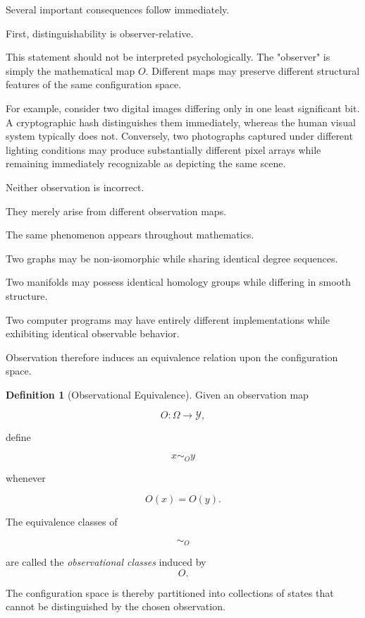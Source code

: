 \documentclass[11pt]{book}
\numberwithin{equation}{chapter}
\theoremstyle{definition}
\newtheorem{definition}{Definition}[chapter]
\theoremstyle{plain}
\begin{document}
Several important consequences follow immediately.

First, distinguishability is observer-relative.

This statement should not be interpreted psychologically. The "observer" is simply the mathematical map \(O\). Different maps may preserve different structural features of the same configuration space.

For example, consider two digital images differing only in one least significant bit. A cryptographic hash distinguishes them immediately, whereas the human visual system typically does not. Conversely, two photographs captured under different lighting conditions may produce substantially different pixel arrays while remaining immediately recognizable as depicting the same scene.

Neither observation is incorrect.

They merely arise from different observation maps.

The same phenomenon appears throughout mathematics.

Two graphs may be non-isomorphic while sharing identical degree sequences.

Two manifolds may possess identical homology groups while differing in smooth structure.

Two computer programs may have entirely different implementations while exhibiting identical observable behavior.

Observation therefore induces an equivalence relation upon the configuration space.

\begin{definition}[Observational Equivalence]

Given an observation map

\[
O:\Omega\rightarrow\mathcal{Y},
\]

define

\[
x\sim_O y
\]

whenever

\[
O(x)=O(y).
\]

The equivalence classes of

\[
\sim_O
\]

are called the \emph{observational classes} induced by
\[
O.
\]

\end{definition}

The configuration space is thereby partitioned into collections of states that cannot be distinguished by the chosen observation.
\end{document}
